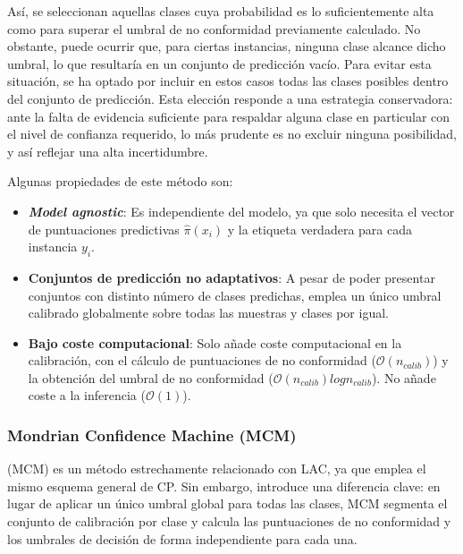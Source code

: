 Así, se seleccionan aquellas clases cuya probabilidad es lo suficientemente alta como para superar el umbral 
de no conformidad previamente calculado. No obstante, puede ocurrir que, para ciertas instancias, ninguna 
clase alcance dicho umbral, lo que resultaría en un conjunto de predicción vacío. Para evitar esta situación, 
se ha optado por incluir en estos casos todas las clases posibles dentro del conjunto de predicción. Esta 
elección responde a una estrategia conservadora: ante la falta de evidencia suficiente para respaldar alguna 
clase en particular con el nivel de confianza requerido, lo más prudente es no excluir ninguna posibilidad, y
así reflejar una alta incertidumbre. 

Algunas propiedades de este método son:

\begin{itemize}

    \item \textbf{\textit{Model agnostic}}: Es independiente del modelo, ya que solo necesita el vector de 
    puntuaciones predictivas $\hat{\pi}(x_i)$ y la etiqueta verdadera para cada instancia $y_i$.  

    \item \textbf{Conjuntos de predicción no adaptativos}: A pesar de poder presentar conjuntos con distinto
    número de clases predichas, emplea un único umbral calibrado globalmente sobre todas las muestras y 
    clases por igual. 

    \item \textbf{Bajo coste computacional}: Solo añade coste computacional en la calibración, con el cálculo
    de puntuaciones de no conformidad ($\mathcal{O}(n_{calib})$) y la obtención del umbral de no conformidad
    ($\mathcal{O}(n_{calib})log n_{calib}$). No añade coste a la inferencia ($\mathcal{O}(1)$).
    
\end{itemize}



\subsubsection{Mondrian Confidence Machine (MCM)}

(MCM) \cite{vovk2003} es un método estrechamente relacionado con LAC, ya que emplea el mismo esquema general 
de CP. Sin embargo, introduce una diferencia clave: en lugar de aplicar un único umbral global para todas las 
clases, MCM segmenta el conjunto de calibración por clase y calcula las puntuaciones de no conformidad y los 
umbrales de decisión de forma independiente para cada una.

